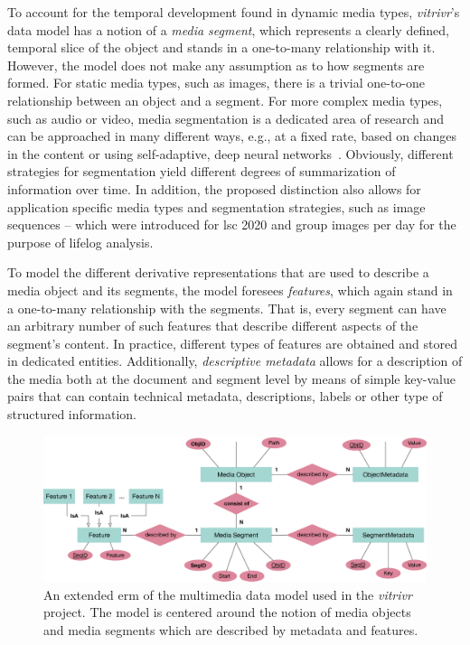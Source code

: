 To account for the temporal development found in dynamic media types, \emph{vitrivr}'s data model has a notion of a \emph{media segment}, which represents a clearly defined, temporal slice of the object and stands in a one-to-many relationship with it. However, the model does not make any assumption as to how segments are formed. For static media types, such as images, there is a trivial one-to-one relationship between an object and a segment. For more complex media types, such as audio or video, media segmentation is a dedicated area of research \cite{Koprinska:2001temporal} and can be approached in many different ways, e.g., at a fixed rate, based on changes in the content \cite{Foote:2000Automatic,Tsai:2016video} or using self-adaptive, deep neural networks~\cite{Souvcek:2019transnet}. Obviously, different strategies for segmentation yield different degrees of summarization of information over time. In addition, the proposed distinction also allows for application specific media types and segmentation strategies, such as image sequences -- which were introduced for \acrshort{lsc} 2020 \cite{Heller:2020Interactive} and group images per day for the purpose of lifelog analysis.

To model the different derivative representations that are used to describe a media object and its segments, the model foresees \emph{features}, which again stand in a one-to-many relationship with the segments. That is, every segment can have an arbitrary number of such features that describe different aspects of the segment's content. In practice, different types of features are obtained and stored in dedicated entities. Additionally, \emph{descriptive metadata} allows for a description of the media both at the document and segment level by means of simple key-value pairs that can contain technical metadata, descriptions, labels or other type of structured information.

\begin{figure}[bt]
    \centering
    \includegraphics[width=\textwidth]{figures/erm-media-data-vitrivr}
    \caption{An extended \acrshort{erm} of the multimedia data model used in the \emph{vitrivr} project. The model is centered around the notion of media objects and media segments which are described by metadata and features.}
    \label{figure:erm_mediadata_vitrivr}
\end{figure}

